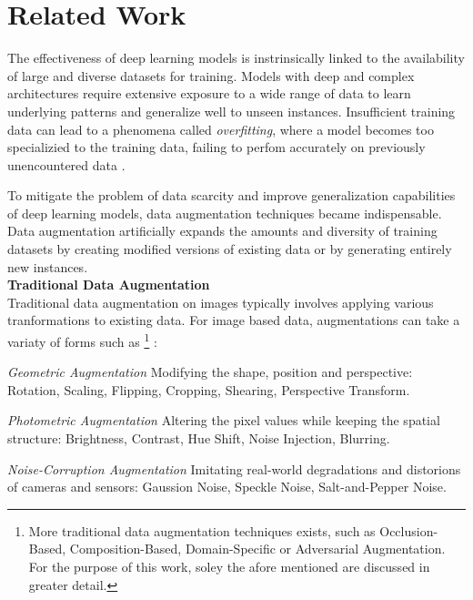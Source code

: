 \section{Related Work}\label{related_work}


The effectiveness of deep learning models is instrinsically linked to the availability of large and diverse datasets for training. Models with deep and complex architectures require extensive exposure to a wide range of data to learn underlying patterns and generalize well to unseen instances. Insufficient training data can lead to a phenomena called \textit{overfitting}, where a model becomes too specializied to the training data, failing to perfom accurately on previously unencountered data \cite{Ying2019overfittinganditssolutions}. 

To mitigate the problem of data scarcity and improve generalization capabilities of deep learning models, data augmentation techniques became indispensable. Data augmentation artificially expands the amounts and diversity of training datasets by creating modified versions of existing data or by generating entirely new instances. \\

\textbf{Traditional Data Augmentation}\label{traditional_data_augmentation} \\
Traditional data augmentation on images typically involves applying various tranformations to existing data. For image based data, augmentations can take a variaty of forms such as
\footnote{More traditional data augmentation techniques exists, such as Occlusion-Based, Composition-Based, Domain-Specific or Adversarial Augmentation. For the purpose of this work,  soley the afore mentioned are discussed in greater detail.}
: 

\textit{Geometric Augmentation}
Modifying the shape, position and perspective: Rotation, Scaling, Flipping, Cropping, Shearing, Perspective Transform.

\textit{Photometric Augmentation}
Altering the pixel values while keeping the spatial structure: Brightness, Contrast, Hue Shift, Noise Injection, Blurring.

\textit{Noise-Corruption Augmentation}
Imitating real-world degradations and distorions of cameras and sensors: Gaussion Noise, Speckle Noise, Salt-and-Pepper Noise.

